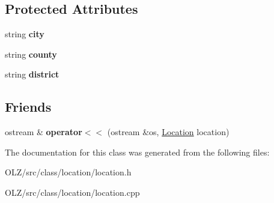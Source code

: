 \subsection*{Protected Attributes}
\begin{DoxyCompactItemize}
\item 
\hypertarget{class_location_a0179634b6ba4046f74f57949e789abfb}{}string {\bfseries city}\label{class_location_a0179634b6ba4046f74f57949e789abfb}

\item 
\hypertarget{class_location_a648dadbf656ddaff096a36faa271a165}{}string {\bfseries county}\label{class_location_a648dadbf656ddaff096a36faa271a165}

\item 
\hypertarget{class_location_a3739b4e334dfd90923671fb543baef4a}{}string {\bfseries district}\label{class_location_a3739b4e334dfd90923671fb543baef4a}

\end{DoxyCompactItemize}
\subsection*{Friends}
\begin{DoxyCompactItemize}
\item 
\hypertarget{class_location_a4ad6e0794e80acce506f747d8fd35be9}{}ostream \& {\bfseries operator$<$$<$} (ostream \&os, \hyperlink{class_location}{Location} location)\label{class_location_a4ad6e0794e80acce506f747d8fd35be9}

\end{DoxyCompactItemize}


The documentation for this class was generated from the following files\+:\begin{DoxyCompactItemize}
\item 
O\+L\+Z/src/class/location/location.\+h\item 
O\+L\+Z/src/class/location/location.\+cpp\end{DoxyCompactItemize}
